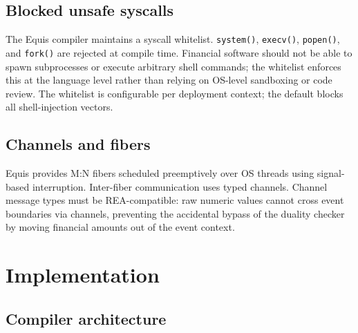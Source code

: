 \documentclass[11pt,a4paper]{article}
\theoremstyle{remark}
\begin{document}
\subsection{Blocked unsafe syscalls}

The Equis compiler maintains a syscall whitelist. \texttt{system()},
\texttt{execv()}, \texttt{popen()}, and \texttt{fork()} are rejected at
compile time. Financial software should not be able to spawn
subprocesses or execute arbitrary shell commands; the whitelist enforces
this at the language level rather than relying on OS-level sandboxing or
code review. The whitelist is configurable per deployment context; the
default blocks all shell-injection vectors.

\subsection{Channels and fibers}

Equis provides M:N fibers scheduled preemptively over OS threads using
signal-based interruption. Inter-fiber communication uses typed
channels. Channel message types must be REA-compatible: raw numeric
values cannot cross event boundaries via channels, preventing the
accidental bypass of the duality checker by moving financial amounts
out of the event context.

\section{Implementation}\label{sec:impl}

\subsection{Compiler architecture}
\end{document}
